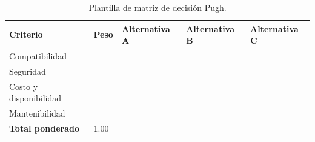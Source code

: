 \begin{table}[H]\centering\small\caption{Plantilla de matriz de decisión Pugh.}
\begin{tabularx}{\textwidth}{YL{1.8cm}C{2cm}C{2cm}C{2cm}}\toprule
\textbf{Criterio}&\textbf{Peso}&\textbf{Alternativa A}&\textbf{Alternativa B}&\textbf{Alternativa C}\\\midrule
Compatibilidad&&&&\\
Seguridad&&&&\\
Costo y disponibilidad&&&&\\
Mantenibilidad&&&&\\\midrule
\textbf{Total ponderado}&1.00&\campo{--}&\campo{--}&\campo{--}\\\bottomrule
\end{tabularx}\end{table}
